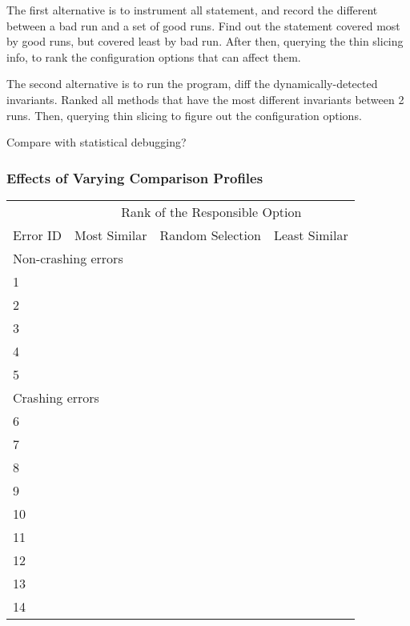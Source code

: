 The first alternative is to instrument all statement, and record the different between a bad run and
a set of good runs. Find out the statement covered most by good runs, but covered least by bad run.
After then, querying the thin slicing info, to rank the configuration options that can affect them.


The second alternative is to run the program, diff the dynamically-detected invariants. Ranked all
methods that have the most different invariants between 2 runs. Then, querying thin slicing to
figure out the configuration options.

Compare with statistical debugging?

\subsubsection{Effects of Varying Comparison Profiles}
\label{sec:ranking}


\begin{table}[t]
\setlength{\tabcolsep}{.54\tabcolsep}
\begin{tabular}{|l|l|l|l|}
\hline
  & \multicolumn{3}{|c|}{Rank of the Responsible Option } \\
\cline{2-4}
 Error ID & Most Similar& Random Selection& Least Similar\\
 \hline
\hline
\multicolumn{4}{|l|}{Non-crashing errors}   \\
 \hline
 1 & & &\\
 2 & & &\\
 3 & & &\\
 4 & & &\\
 5 & & &\\
\hline
\hline
\multicolumn{4}{|l|}{Crashing errors}   \\
\hline
 6 & & &\\
 7 & & &\\
 8 & & &\\
 9 & & &\\
 10 & & &\\
 11 & & &\\
 12 & & &\\
 13 & & &\\
 14 & & &\\
\hline
\end{tabular}

\end{table}


